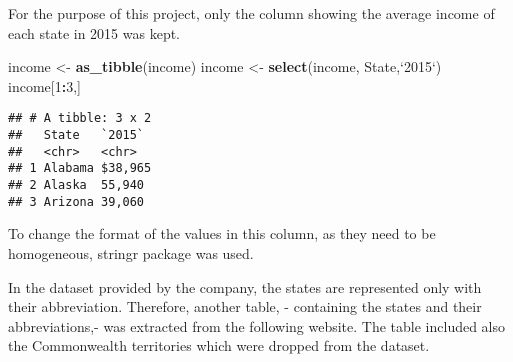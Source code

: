 \documentclass[]{article}
\newenvironment{Shaded}{\begin{snugshade}}{\end{snugshade}}
\newcommand{\KeywordTok}[1]{\textcolor[rgb]{0.13,0.29,0.53}{\textbf{#1}}}
\newcommand{\DataTypeTok}[1]{\textcolor[rgb]{0.13,0.29,0.53}{#1}}
\newcommand{\DecValTok}[1]{\textcolor[rgb]{0.00,0.00,0.81}{#1}}
\newcommand{\StringTok}[1]{\textcolor[rgb]{0.31,0.60,0.02}{#1}}
\newcommand{\OperatorTok}[1]{\textcolor[rgb]{0.81,0.36,0.00}{\textbf{#1}}}
\newcommand{\NormalTok}[1]{#1}
\begin{document}
For the purpose of this project, only the column showing the average
income of each state in 2015 was kept.

\begin{Shaded}
\begin{Highlighting}[]
\NormalTok{income <-}\StringTok{ }\KeywordTok{as_tibble}\NormalTok{(income)}
\NormalTok{income <-}\StringTok{ }\KeywordTok{select}\NormalTok{(income, State,}\StringTok{`}\DataTypeTok{2015}\StringTok{`}\NormalTok{)}
\NormalTok{income[}\DecValTok{1}\OperatorTok{:}\DecValTok{3}\NormalTok{,]}
\end{Highlighting}
\end{Shaded}

\begin{verbatim}
## # A tibble: 3 x 2
##   State   `2015` 
##   <chr>   <chr>  
## 1 Alabama $38,965
## 2 Alaska  55,940 
## 3 Arizona 39,060
\end{verbatim}

To change the format of the values in this column, as they need to be
homogeneous, stringr package was used.

\begin{Shaded}
\end{Shaded}

In the dataset provided by the company, the states are represented only
with their abbreviation. Therefore, another table, - containing the
states and their abbreviations,- was extracted from the following
website. The table included also the Commonwealth territories which were
dropped from the dataset.
\end{document}
